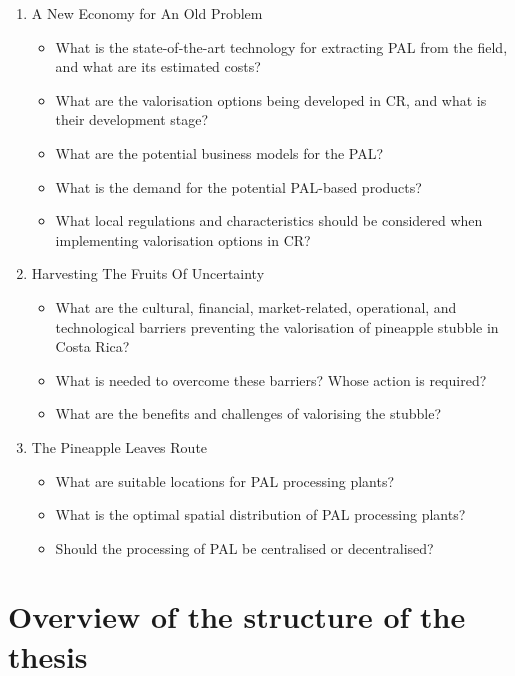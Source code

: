      
\begin{enumerate}

    \item A New Economy for An Old Problem
    \begin{itemize}
        \item What is the state-of-the-art technology for extracting PAL from the field, and what are its estimated costs?
        \item What are the valorisation options being developed in CR, and what is their development stage?
        \item What are the potential business models for the PAL?
        \item What is the demand for the potential PAL-based products?
        \item What local regulations and characteristics should be considered when implementing valorisation options in CR?
    \end{itemize}
    
    \item Harvesting The Fruits Of Uncertainty
    \begin{itemize}
        \item What are the cultural, financial, market-related, operational, and technological barriers preventing the valorisation of pineapple stubble in Costa Rica?
        \item What is needed to overcome these barriers? Whose action is required?
        \item What are the benefits and challenges of valorising the stubble?
    \end{itemize}
    
    \item The Pineapple Leaves Route
    \begin{itemize}
         \item What are suitable locations for PAL processing plants?
        \item What is the optimal spatial distribution of PAL processing plants? 
        \item Should the processing of PAL be centralised or decentralised? 
     \end{itemize}
    
\end{enumerate}

\section{Overview of the structure of the thesis}

